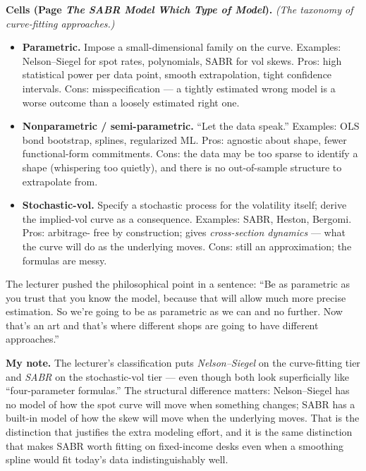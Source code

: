 \begin{keyblock}
\textbf{Cells (Page \emph{The SABR Model} \textperiodcentered{}
\emph{Which Type of Model}).}
\emph{(The taxonomy of curve-fitting approaches.)}
\begin{itemize}
  \item \textbf{Parametric.} Impose a small-dimensional family on the
        curve. Examples: Nelson--Siegel for spot rates, polynomials,
        SABR for vol skews. Pros: high statistical power per data
        point, smooth extrapolation, tight confidence intervals.
        Cons: misspecification --- a tightly estimated wrong model is
        a worse outcome than a loosely estimated right one.
  \item \textbf{Nonparametric / semi-parametric.} ``Let the data
        speak.'' Examples: OLS bond bootstrap, splines, regularized
        ML. Pros: agnostic about shape, fewer functional-form
        commitments. Cons: the data may be too sparse to identify a
        shape (whispering too quietly), and there is no
        out-of-sample structure to extrapolate from.
  \item \textbf{Stochastic-vol.} Specify a stochastic process for the
        volatility itself; derive the implied-vol curve as a
        consequence. Examples: SABR, Heston, Bergomi. Pros: arbitrage-
        free by construction; gives \emph{cross-section dynamics} ---
        what the curve will do as the underlying moves. Cons: still
        an approximation; the formulas are messy.
\end{itemize}
\end{keyblock}

The lecturer pushed the philosophical point in a sentence:
``Be as parametric as you trust that you know the model, because that
will allow much more precise estimation. So we're going to be as
parametric as we can and no further. Now that's an art and that's where
different shops are going to have different approaches.''

\begin{checkpoint}
\textbf{My note.} The lecturer's classification puts \emph{Nelson--Siegel}
on the curve-fitting tier and \emph{SABR} on the stochastic-vol tier ---
even though both look superficially like ``four-parameter formulas.''
The structural difference matters: Nelson--Siegel has no model of how
the spot curve will move when something changes; SABR has a built-in
model of how the skew will move when the underlying moves. That is
the distinction that justifies the extra modeling effort, and it is
the same distinction that makes SABR worth fitting on fixed-income
desks even when a smoothing spline would fit today's data
indistinguishably well.
\end{checkpoint}


